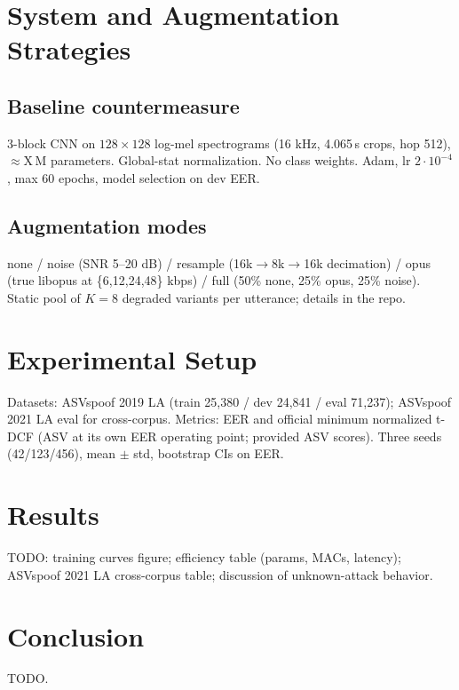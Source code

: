 \documentclass[conference]{IEEEtran}
\begin{document}
\section{System and Augmentation Strategies}
\subsection{Baseline countermeasure}
3-block CNN on $128\times128$ log-mel spectrograms (16 kHz, 4.065\,s crops,
hop 512), $\approx$X\,M parameters. Global-stat normalization. No class
weights. Adam, lr $2\cdot10^{-4}$, max 60 epochs, model selection on dev EER.

\subsection{Augmentation modes}
none / noise (SNR 5--20 dB) / resample (16k$\to$8k$\to$16k decimation) / opus
(true libopus at \{6,12,24,48\} kbps) / full (50\% none, 25\% opus, 25\% noise).
Static pool of $K{=}8$ degraded variants per utterance; details in the repo.

\section{Experimental Setup}
Datasets: ASVspoof 2019 LA (train 25{,}380 / dev 24{,}841 / eval 71{,}237);
ASVspoof 2021 LA eval for cross-corpus. Metrics: EER and official minimum
normalized t-DCF (ASV at its own EER operating point; provided ASV scores).
Three seeds (42/123/456), mean $\pm$ std, bootstrap CIs on EER.

\section{Results}
TODO: training curves figure; efficiency table (params, MACs, latency);
ASVspoof 2021 LA cross-corpus table; discussion of unknown-attack behavior.

\section{Conclusion}
TODO.



\end{document}
